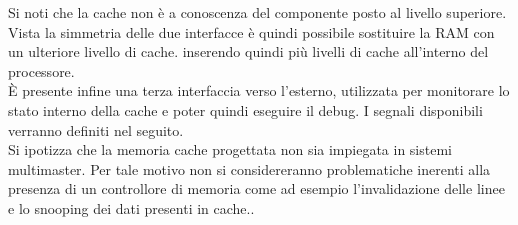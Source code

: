 Si noti che la cache non \`e a conoscenza del componente posto al livello superiore. Vista la simmetria delle due interfacce \`e quindi possibile sostituire la RAM con un ulteriore livello di cache. inserendo quindi pi\`u livelli di cache all'interno del processore.\\
\`E presente infine una terza interfaccia verso l'esterno, utilizzata per monitorare lo stato interno della cache e poter quindi eseguire il debug.
I segnali disponibili verranno definiti nel seguito.\\
Si ipotizza che la memoria cache progettata non sia impiegata in sistemi multimaster. Per tale motivo non si considereranno problematiche inerenti alla presenza di un controllore di memoria come ad esempio l'invalidazione delle linee e lo snooping dei dati presenti in cache..










